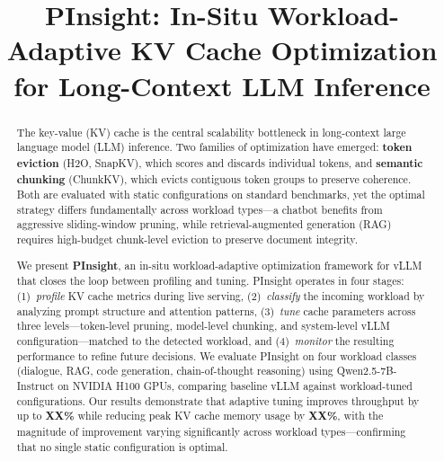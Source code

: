 \documentclass[conference]{IEEEtran}
\begin{document}
\title{PInsight: In-Situ Workload-Adaptive KV Cache Optimization for Long-Context LLM Inference}

\author{
}

\maketitle

\begin{abstract}
The key-value (KV) cache is the central scalability bottleneck in long-context large language model (LLM) inference. Two families of optimization have emerged: \textbf{token eviction} (H2O, SnapKV), which scores and discards individual tokens, and \textbf{semantic chunking} (ChunkKV), which evicts contiguous token groups to preserve coherence. Both are evaluated with static configurations on standard benchmarks, yet the optimal strategy differs fundamentally across workload types---a chatbot benefits from aggressive sliding-window pruning, while retrieval-augmented generation (RAG) requires high-budget chunk-level eviction to preserve document integrity.

We present \textbf{PInsight}, an in-situ workload-adaptive optimization framework for vLLM that closes the loop between profiling and tuning. PInsight operates in four stages: (1)~\textit{profile} KV cache metrics during live serving, (2)~\textit{classify} the incoming workload by analyzing prompt structure and attention patterns, (3)~\textit{tune} cache parameters across three levels---token-level pruning, model-level chunking, and system-level vLLM configuration---matched to the detected workload, and (4)~\textit{monitor} the resulting performance to refine future decisions. We evaluate PInsight on four workload classes (dialogue, RAG, code generation, chain-of-thought reasoning) using Qwen2.5-7B-Instruct on NVIDIA H100 GPUs, comparing baseline vLLM against workload-tuned configurations. Our results demonstrate that adaptive tuning improves throughput by up to \textbf{XX\%} while reducing peak KV cache memory usage by \textbf{XX\%}, with the magnitude of improvement varying significantly across workload types---confirming that no single static configuration is optimal.
\end{abstract}
\end{document}
